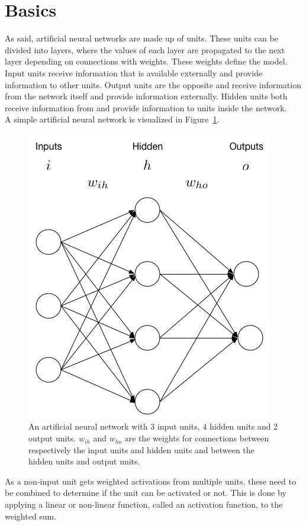 \section{Basics} %
\label{sec:basics}
As said, artificial neural networks are made up of units. These units can be divided into layers, where the values of each layer are propagated to the next layer depending on connections with weights. These weights define the model.
Input units receive information that is available externally and provide information to other units. Output units are the opposite and receive information from the network itself and provide information externally. Hidden units both receive information from and provide information to units inside the network.\\
A simple artificial neural network is visualized in Figure~\ref{fig:ann}.\\
\begin{figure}[htb]
    \centering
    \includegraphics[width=.7\linewidth]{images/ann.png}
    \caption[An artificial neural network]{An artificial neural network with 3 input units, 4 hidden units and 2 output units. $w_{ih}$ and $w_{ho}$ are the weights for connections between respectively the input units and hidden units and between the hidden units and output units.}
    \label{fig:ann}
\end{figure}
As a non-input unit gets weighted activations from multiple units, these need to be combined to determine if the unit can be activated or not. This is done by applying a linear or non-linear function, called an activation function, to the weighted sum.

